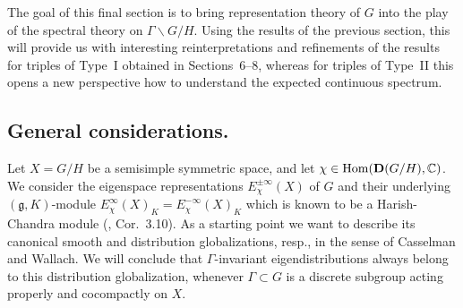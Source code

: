\documentclass[10]{amsart}
\theoremstyle{remark}
\theoremstyle{definition}
\numberwithin{equation}{section}
\newcommand{\C}{\mathbb{C}}           %
\newcommand{\Hom}{\mathrm{Hom}}
\newcommand{\fg}{{\mathfrak g}}
\begin{document}
{%

The goal of this final section is to bring representation theory of $G$ into the play of the spectral theory on $\Gamma\backslash G/H$. Using the results of the previous
section, this will provide us with interesting reinterpretations and refinements of the results for triples of Type~I obtained in Sections~6--8, whereas for triples of Type~II this opens a new perspective how to understand the expected continuous spectrum.

\subsection{General considerations.}\label{gc} 
Let $X=G/H$ be a semisimple symmetric space, and let $\chi\in\Hom({\bf D}(G/H),\C)$. We consider the eigenspace representations $E_\chi^{\pm\infty}(X)$ of $G$ and their
underlying $(\fg,K)$-module $E_\chi^{\infty}(X)_K=E_\chi^{-\infty}(X)_K$  which is known to be a Harish-Chandra module (\cite{Ban87}, Cor.~3.10).
As a starting point we want to describe its canonical smooth and distribution globalizations, resp., in the sense of Casselman and Wallach. We will conclude that $\Gamma$-invariant
eigendistributions always belong to this distribution globalization, whenever $\Gamma\subset G$ is a discrete subgroup acting properly and cocompactly on $X$.

}
\end{document}
